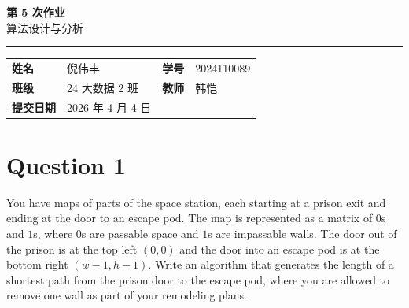 ﻿\documentclass[12pt,a4paper]{article}
\newcommand{\course}{算法设计与分析}
\newcommand{\homeworktitle}{第 5 次作业}
\newcommand{\studentname}{倪伟丰}
\newcommand{\studentid}{2024110089}
\newcommand{\classname}{24 大数据 2 班}
\newcommand{\teacher}{韩恺}
\newcommand{\duedate}{2026 年 4 月 4 日}
\begin{document}
\begin{center}
  {\Huge\bfseries\color{mainblue}\homeworktitle}\\[0.6em]
  {\Large\course}\\[1.2em]
  {\color{linegray}\rule{0.9\textwidth}{0.8pt}}
\end{center}

\begin{infobox}
\begin{tabularx}{\textwidth}{>{\bfseries}p{2.2cm} X >{\bfseries}p{2.2cm} X}
姓名 & \studentname & 学号 & \studentid \\
班级 & \classname & 教师 & \teacher \\
提交日期 & \duedate &  &  \\
\end{tabularx}
\end{infobox}

\section{Question 1}

You have maps of parts of the space station, each starting at a prison exit and ending at the door to an escape pod. The map is represented as a matrix of $0$s and $1$s, where $0$s are passable space and $1$s are impassable walls. The door out of the prison is at the top left $(0,0)$ and the door into an escape pod is at the bottom right $(w-1,h-1)$.
Write an algorithm that generates the length of a shortest path from the prison door to the escape pod, where you are allowed to remove one wall as part of your remodeling plans.
\end{document}
